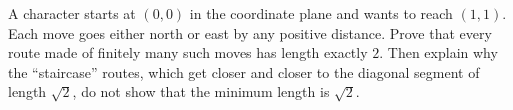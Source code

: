 A character starts at $(0,0)$ in the coordinate plane and wants to reach $(1,1)$. Each move goes either north or east by any positive distance. Prove that every route made of finitely many such moves has length exactly $2$. Then explain why the ``staircase'' routes, which get closer and closer to the diagonal segment of length $\sqrt2$, do not show that the minimum length is $\sqrt2$.
